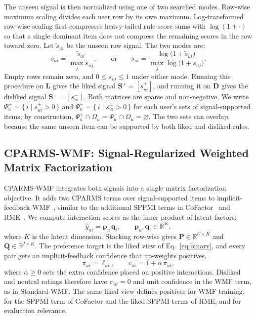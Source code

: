 \documentclass[pdflatex,sn-vancouver-num]{sn-jnl}%
\theoremstyle{thmstyleone}%
\theoremstyle{thmstyletwo}%
\theoremstyle{thmstylethree}%
\begin{document}
The unseen signal is then normalized using one of two searched modes. Row-wise maximum scaling divides each user row by its own maximum. Log-transformed row-wise scaling first compresses heavy-tailed rule-score sums with $\log(1+\cdot)$ so that a single dominant item does not compress the remaining scores in the row toward zero. Let $\tilde{s}_{ui}$ be the unseen raw signal. The two modes are:
\begin{equation}
s_{ui} = \frac{\tilde{s}_{ui}}{\max_{j}\tilde{s}_{uj}},
\qquad\text{or}\qquad
s_{ui} = \frac{\log\!\big(1+\tilde{s}_{ui}\big)}{\max_{j}\log\!\big(1+\tilde{s}_{uj}\big)}.
\label{eq:normalize}
\end{equation}
Empty rows remain zero, and $0 \le s_{ui} \le 1$ under either mode. Running this procedure on $\mathbf{L}$ gives the liked signal $\mathbf{S}^{+} = [s^{+}_{ui}]$, and running it on $\mathbf{D}$ gives the disliked signal $\mathbf{S}^{-} = [s^{-}_{ui}]$. Both matrices are sparse and non-negative. We write $\Psi_u^{+} = \{\, i \mid s^{+}_{ui} > 0 \,\}$ and $\Psi_u^{-} = \{\, i \mid s^{-}_{ui} > 0 \,\}$ for each user's sets of signal-supported items; by construction, $\Psi_u^{+} \cap \Omega_u = \Psi_u^{-} \cap \Omega_u = \varnothing$. The two sets can overlap, because the same unseen item can be supported by both liked and disliked rules.

\subsection{CPARMS-WMF: Signal-Regularized Weighted Matrix Factorization}

CPARMS-WMF integrates both signals into a single matrix factorization objective. It adds two CPARMS terms over signal-supported items to implicit-feedback WMF~\cite{hu2008implicit}, similar to the additional SPPMI terms in CoFactor~\cite{liang2016cofactor} and RME~\cite{tran2018rme}. We compute interaction scores as the inner product of latent factors:
\begin{equation}
\hat{y}_{ui} = \mathbf{p}_u^{\top}\mathbf{q}_i,
\qquad \mathbf{p}_u, \mathbf{q}_i \in \mathbb{R}^{K},
\label{eq:mf_pred}
\end{equation}
where $K$ is the latent dimension. Stacking row-wise gives $\mathbf{P}\in\mathbb{R}^{U\times K}$ and $\mathbf{Q}\in\mathbb{R}^{I\times K}$. The preference target is the liked view of Eq.~\eqref{eq:binary}, and every pair gets an implicit-feedback confidence that up-weights positives,
\begin{equation}
\pi_{ui} = \ell_{ui},
\qquad
c_{ui} = 1 + \alpha\,\pi_{ui},
\label{eq:pref_conf}
\end{equation}
where $\alpha \ge 0$ sets the extra confidence placed on positive interactions. Disliked and neutral ratings therefore have $\pi_{ui}=0$ and unit confidence in the WMF term, as in Standard-WMF. The same liked view defines positives for WMF training, for the SPPMI term of CoFactor and the liked SPPMI terms of RME, and for evaluation relevance.
\end{document}
